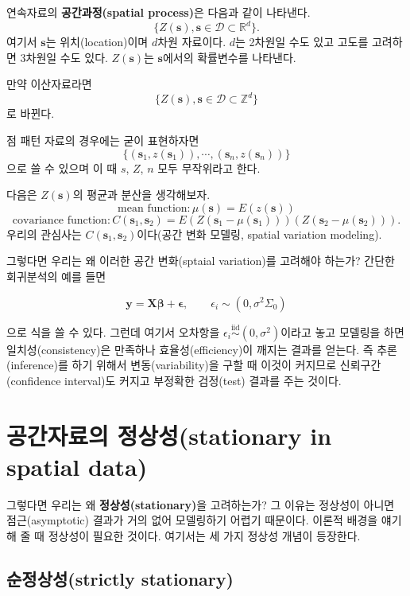 \documentclass[b5paper,]{scrbook}
\theoremstyle{plain}
\theoremstyle{definition}
\numberwithin{equation}{section}
\begin{document}
연속자료의 \textbf{공간과정(spatial process)}은 다음과 같이 나타낸다.
\[\{Z (\mathbf{s}), \mathbf{s} \in \mathcal{D} \subset \mathbb{R}^{d} \} .\]
여기서 \(\mathbf{s}\)는 위치(location)이며 \(d\)차원 자료이다. \(d\)는
2차원일 수도 있고 고도를 고려하면 3차원일 수도 있다. \(Z(\mathbf{s})\)는
\(\mathbf{s}\)에서의 확률변수를 나타낸다.

만약 이산자료라면
\[\{Z (\mathbf{s}), \mathbf{s} \in \mathcal{D} \subset \mathbb{Z}^{d} \} \]
로 바뀐다.

점 패턴 자료의 경우에는 굳이 표현하자면
\[\{ (\mathbf{s}_{1},z(\mathbf{s}_{1})), \cdots , (\mathbf{s}_{n},z(\mathbf{s}_{n}))  \} \]
으로 쓸 수 있으며 이 때 \(s\), \(Z\), \(n\) 모두 무작위라고 한다.

다음은 \(Z(\mathbf{s})\)의 평균과 분산을 생각해보자.
\[\text{mean function}:\mu(\mathbf{s})=E(z(\mathbf{s}))\]
\[\text{covariance function}: C(\mathbf{s}_{1},\mathbf{s}_{2})=E(Z(\mathbf{s}_{1}-\mu(\mathbf{s}_{1})))(Z(\mathbf{s}_{2}-\mu(\mathbf{s}_{2}))).\]
우리의 관심사는 \(C(\mathbf{s}_{1},\mathbf{s}_{2})\)이다(공간 변화
모델링, spatial variation modeling).

그렇다면 우리는 왜 이러한 공간 변화(sptaial variation)를 고려해야
하는가? 간단한 회귀분석의 예를 들면

\begin{equation}
\mathbf{y}=\mathbf{X}\boldsymbol{\beta}+\boldsymbol{\epsilon}, \qquad{\epsilon_{i} \sim (0, \sigma^{2}\Sigma_{0})}
\end{equation}

으로 식을 쓸 수 있다. 그런데 여기서 오차항을
\(\epsilon_{i} \stackrel{\text{iid}}{\sim} (0, \sigma^{2})\)이라고 놓고
모델링을 하면 일치성(consistency)은 만족하나 효율성(efficiency)이 깨지는
결과를 얻는다. 즉 추론(inference)를 하기 위해서 변동(variability)을 구할
때 이것이 커지므로 신뢰구간(confidence interval)도 커지고 부정확한
검정(test) 결과를 주는 것이다.

\section{공간자료의 정상성(stationary in spatial
data)}\label{-stationary-in-spatial-data}

그렇다면 우리는 왜 \textbf{정상성(stationary)}을 고려하는가? 그 이유는
정상성이 아니면 점근(asymptotic) 결과가 거의 없어 모델링하기 어렵기
때문이다. 이론적 배경을 얘기해 줄 때 정상성이 필요한 것이다. 여기서는 세
가지 정상성 개념이 등장한다.

\subsection{순정상성(strictly stationary)}\label{strictly-stationary}
\end{document}
